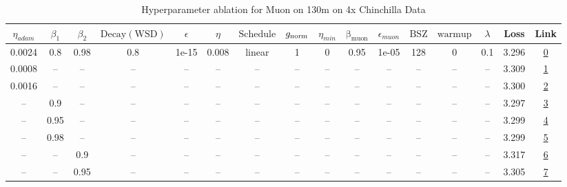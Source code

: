 \begin{table}[H]
\centering
\caption{Hyperparameter ablation for Muon on 130m on 4x Chinchilla Data}
\label{tab:ablation_muon_130m_on_4x_chinchilla_data}
\begin{tabular}{cccccccccccccccc}
\toprule
$\eta_{adam}$ & $\beta_1$ & $\beta_2$ & $\mathrm{Decay (WSD)}$ & $\epsilon$ & $\eta$ & $\mathrm{Schedule}$ & $g_{\mathrm{norm}}$ & $\eta_{min}$ & $\mathrm{\beta_{muon}}$ & $\epsilon_{muon}$ & $\mathrm{BSZ}$ & $\mathrm{warmup}$ & $\lambda$ & Loss & Link \\
\midrule
0.0024 & 0.8 & 0.98 & 0.8 & 1e-15 & 0.008 & linear & 1 & 0 & 0.95 & 1e-05 & 128 & 0 & 0.1 & 3.296 & \href{https://wandb.ai/marin-community/optimizer-scaling/runs/sweep-130m-10B-muonz43402blr0.008-wd0.1-minlr0-warmup0-b10.8-b20-82a88f}{0} \\
\midrule
0.0008 & -- & -- & -- & -- & -- & -- & -- & -- & -- & -- & -- & -- & -- & 3.309 & \href{https://wandb.ai/marin-community/optimizer-scaling/runs/sweep-130m-10B-muonz2bd448lr0.008-wd0.1-minlr0-warmup0-b10.8-b20-9b764e}{1} \\
0.0016 & -- & -- & -- & -- & -- & -- & -- & -- & -- & -- & -- & -- & -- & 3.300 & \href{https://wandb.ai/marin-community/optimizer-scaling/runs/sweep-130m-10B-muonz68f5fdlr0.008-wd0.1-minlr0-warmup0-b10.8-b20-1395fd}{2} \\
-- & 0.9 & -- & -- & -- & -- & -- & -- & -- & -- & -- & -- & -- & -- & 3.297 & \href{https://wandb.ai/marin-community/optimizer-scaling/runs/sweep-130m-10B-muonzbb0111lr0.008-wd0.1-minlr0-warmup0-b10.9-b20-e90842}{3} \\
-- & 0.95 & -- & -- & -- & -- & -- & -- & -- & -- & -- & -- & -- & -- & 3.299 & \href{https://wandb.ai/marin-community/optimizer-scaling/runs/sweep-130m-10B-muonz5e66d9lr0.008-wd0.1-minlr0-warmup0-b10.95-b2-52e19f}{4} \\
-- & 0.98 & -- & -- & -- & -- & -- & -- & -- & -- & -- & -- & -- & -- & 3.299 & \href{https://wandb.ai/marin-community/optimizer-scaling/runs/sweep-130m-10B-muonz764f0blr0.008-wd0.1-minlr0-warmup0-b10.98-b2-60215f}{5} \\
-- & -- & 0.9 & -- & -- & -- & -- & -- & -- & -- & -- & -- & -- & -- & 3.317 & \href{https://wandb.ai/marin-community/optimizer-scaling/runs/sweep-130m-10B-muonzdd254blr0.008-wd0.1-minlr0-warmup0-b10.8-b20-13830a}{6} \\
-- & -- & 0.95 & -- & -- & -- & -- & -- & -- & -- & -- & -- & -- & -- & 3.305 & \href{https://wandb.ai/marin-community/optimizer-scaling/runs/sweep-130m-10B-muonza8c09blr0.008-wd0.1-minlr0-warmup0-b10.8-b20-9004a0}{7} \\

\end{tabular}
\end{table}
